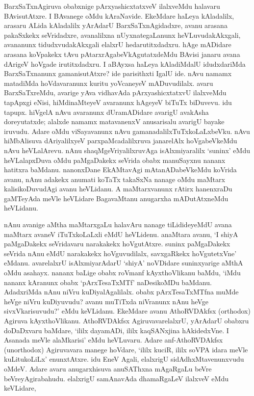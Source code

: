 BarxSaTxnAgiruva obabxnige pArxyashicxtatxveV ilalxveMdu halavaru BAvisutAtxre. I BAvanege oMdu kAraNavide. EkeMdare haLeya kAladalilx, arasaru ALida kAladalilx yArAdarU BarxSaTxnAgidadxre, avanu arasana pakaSxkekx seVridadxre, avanalilxna nUyxnategaLanunx heVLuvudakAkxgali, avananunx tidudxvudakAkxgali elalxrU hedarutitxdadxru. hAge mADidare arasana koVpakekx tAvu pAtarxrAgabeVkAgutatxdeMdu BAvisi janaru avana dArigeV hoVgade irutitxdadxru. I aBAyxsa haLeya kAladiMdalU idudxdariMda BarxSaTxnanunx gamanisutAtxre? ide parisithxti IgalU ide. nAvu namamx 
matadiMda hoVdavaranunx kuritu yoVcaneyeV mADuvudilalx. avaru BarxSaTxreMdu, avarige yAva vidhavAda pArxyashicxtatxvU ilalxveMdu tapApxgi eNisi, hiMdinaMteyeV avaranunx hAgeyeV biTuTx biDuvevu. idu tapupx. hiVgelA nAvu avaranunx dUramADidare avarigU avakAsha doreyutatxde; alalxde namamx matavanenxV anusarisalu avarigU bayake iruvudu. Adare oMdu viSayavanunx nAvu gamanadalilxTuTxkoLaLxbeVku. nAvu hiMbAlisuva dAriyalilxyeV parxpaMcadalilxruva janarelAlx hoVgabeVkeMdu nAvu heVLalArevu. nAnu shaqMgeVriyalilxruvAga isAlxmiyaralilx `suninx' eMdu heVLalapxDuva oMdu paMgaDakekx seVrida obabx manuSayxnu nananx hatitxra baMdanu. nanonxDane EkAMtavAgi mAtanADabeVkeMdu koVrida avanu, nAnu adakekx anumati koTaTx takaSxNa nanage oMdu maMtarx kalisikoDuvudAgi avanu heVLidanu. A maMtarxvanunx rAtirx hanenxraDu gaMTeyAda meVle heVLidare BagavaMtanu anugarxha mADutAtxneMdu heVLidanu.

nAnu avanige aMtha maMtarxgaLu halavAru nanage tiLidideyeMdU avana maMtarx avaneV iTuTxkoLaLxli eMdU heVLidenu. anaMtara avanu, `I shiyA paMgaDakekx seVridavaru narakakekx hoVgutAtxre. suninx paMgaDakekx seVrida nAnu eMdU narakakekx hoVguvudilalx, savxgaRkekx hoVgutetxVne' eMdanu. avarelalxrU isAlxmiyarAdarU `shiyA' noVDidare suninxyarige 
aMthA oMdu asahayx. nananx baLige obabx roVmanf kAyxthoVlikanu baMdu, `iMdu nananx kAranunx obabx `pArxTesaTxMTf' naDesikoMDu baMdanu. AdadxriMda nAnu niVru kuDiyalAgalilalx. obabx pArxTesaTxMTfna muMde heVge niVru kuDiyuvudu? avanu muTiTxda niVranunx nAnu heVge sivxVkarisuvudu?' eMdu keVLidanu. EkeMdare avanu AthoRVDAkfsx {(\rm orthodox)} Agiruva kAyxthoVlikanu. AthoRVDAkfsx AgiruvavarelalxrU, yArAdarU obabxru doDaDxvaru baMdare, `ililx dayamADi, ililx kaqSANxjina hAkidedxVne. I Asanada meVle alaMkarisi' eMdu heVLuvaru. Adare anf-AthoRVDAkfsx {(\rm unorthodox)} Agiruvavara manege hoVdare, `ililx kuciR, ililx soVPA idara meVle kuLitukoLiLx' enunxtAtxre. idu EneV Agali, elalxrigU sidAdhxMtavenunxvudu oMdeV. Adare avaru anugarxhisuva anuSAThxna mAgaRgaLu beVre beVreyAgirabahudu. elalxrigU samAnavAda dhamaRgaLeV ilalxveV eMdu keVLidare,

